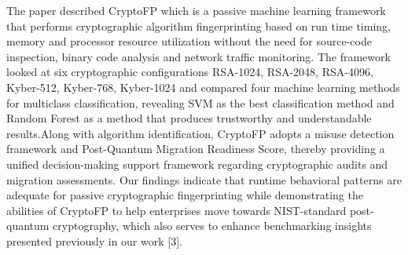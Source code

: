 \documentclass[conference]{IEEEtran}
\begin{document}
The paper described CryptoFP which is a passive machine learning framework that performs cryptographic algorithm fingerprinting based on run time timing, memory and processor resource utilization without the need for source-code inspection, binary code analysis and network traffic monitoring. The framework looked at six cryptographic configurations RSA-1024, RSA-2048, RSA-4096, Kyber-512, Kyber-768, Kyber-1024 and compared four machine learning methods for multiclass classification, revealing SVM as the best classification method and Random Forest as a method that produces trustworthy and understandable results.Along with algorithm identification, CryptoFP adopts a misuse detection framework and Post-Quantum Migration Readiness Score, thereby providing a unified decision-making support framework regarding cryptographic audits and migration assessments. Our findings indicate that runtime behavioral patterns are adequate for passive cryptographic fingerprinting while demonstrating the abilities of CryptoFP to help enterprises move towards NIST-standard post-quantum cryptography, which also serves to enhance benchmarking insights presented previously in our work [3].
\end{document}
